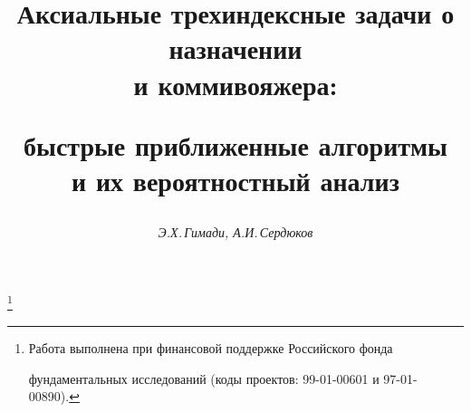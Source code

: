 









\newcommand{\PR}{\operatorname{Pr}}


\newcommand{\Argmin}{\operatorname{Arg\,min}}


\newcommand{\tts}[1]{}


\renewcommand{\baselinestretch}{1.06}







\setcounter{page}{19}















\author{\it Э.Х.\,Гимади, А.И.\,Сердюков}




\title{Аксиальные трехиндексные задачи о назначении\\ и коммивояжера:


быстрые приближенные алгоритмы\\ и их вероятностный анализ }


\thanks{Работа выполнена при финансовой поддержке Российского фонда 


фундаментальных исследований (коды проектов: 99-01-00601 и 97-01-00890).}





\date{}




\pagestyle{plain} %





